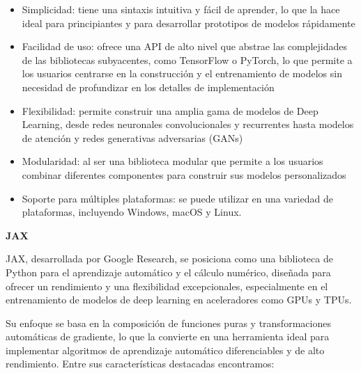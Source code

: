 \documentclass[
  a4paper,
  DIV=11,
  numbers=noendperiod]{scrreprt}
\providecommand{\tightlist}{%
  \setlength{\itemsep}{0pt}\setlength{\parskip}{0pt}}\usepackage{longtable,booktabs,array}
\begin{document}
\begin{itemize}
\tightlist
\item
  Simplicidad: tiene una sintaxis intuitiva y fácil de aprender, lo que
  la hace ideal para principiantes y para desarrollar prototipos de
  modelos rápidamente
\item
  Facilidad de uso: ofrece una API de alto nivel que abstrae las
  complejidades de las bibliotecas subyacentes, como TensorFlow o
  PyTorch, lo que permite a los usuarios centrarse en la construcción y
  el entrenamiento de modelos sin necesidad de profundizar en los
  detalles de implementación
\item
  Flexibilidad: permite construir una amplia gama de modelos de Deep
  Learning, desde redes neuronales convolucionales y recurrentes hasta
  modelos de atención y redes generativas adversarias (GANs)
\item
  Modularidad: al ser una biblioteca modular que permite a los usuarios
  combinar diferentes componentes para construir sus modelos
  personalizados
\item
  Soporte para múltiples plataformas: se puede utilizar en una variedad
  de plataformas, incluyendo Windows, macOS y Linux.
\end{itemize}

\textbf{JAX}

JAX, desarrollada por Google Research, se posiciona como una biblioteca
de Python para el aprendizaje automático y el cálculo numérico, diseñada
para ofrecer un rendimiento y una flexibilidad excepcionales,
especialmente en el entrenamiento de modelos de deep learning en
aceleradores como GPUs y TPUs.

Su enfoque se basa en la composición de funciones puras y
transformaciones automáticas de gradiente, lo que la convierte en una
herramienta ideal para implementar algoritmos de aprendizaje automático
diferenciables y de alto rendimiento. Entre sus características
destacadas encontramos:
\end{document}
